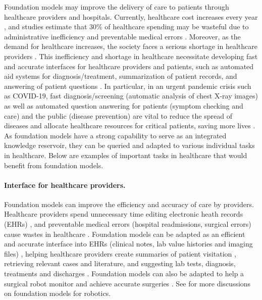 Foundation models may improve the delivery of care to patients through healthcare providers and hospitals. Currently, healthcare cost increases every year \citep{keehan2020national}, and studies estimate that 30\% of healthcare spending may be wasteful due to administrative inefficiency and preventable medical errors \citep{kocher2021reducing}. Moreover, as the demand for healthcare increases, the society faces a serious shortage in healthcare providers \citep{kirch2017addressing}.
This inefficiency and shortage in healthcare necessitate developing fast and accurate interfaces for healthcare providers and patients, such as automated aid systems for diagnosis/treatment, summarization of patient records, and answering of patient questions \citep{davenport2019potential,nie2018deeptag,wang2021domain}.
In particular, in an urgent pandemic crisis such as COVID-19, fast diagnosis/screening (\eg automatic analysis of chest X-ray images) as well as automated question answering for patients (\eg symptom checking and care) and the public (\eg disease prevention) are vital to reduce the spread of diseases and allocate healthcare resources for critical patients, saving more lives \citep{lalmuanawma2020applications}.
As foundation models have a strong capability to serve as an integrated knowledge reservoir, they can be queried and adapted to various individual tasks in healthcare. Below are examples of important tasks in healthcare that would benefit from foundation models.

\paragraph{Interface for healthcare providers.} 
Foundation models can improve the efficiency and accuracy of care by providers.
Healthcare providers spend unnecessary time editing electronic heath records (EHRs) \citep{kocher2021reducing}, and preventable medical errors (\eg hospital readmissions, surgical errors) cause wastes in healthcare \citep{shrank2019waste,shah2020surgical}.
Foundation models can be adapted as an efficient and accurate interface into EHRs (clinical notes, lab value histories and imaging files) \citep{li2020behrt,steinberg2021language,percha2021modern}, helping healthcare providers create summaries of patient visitation \citep{krishna2020generating}, retrieving relevant cases and literature, and suggesting lab tests, diagnosis, treatments and discharges \citep{zhang2019vettag,rasmy2021med}. Foundation models can also be adapted to help a surgical robot monitor and achieve accurate surgeries \citep{diana2015robotic,agrigoroaie2016developing,yu2019reinforcement}. See  for more discussions on foundation models for robotics. 

